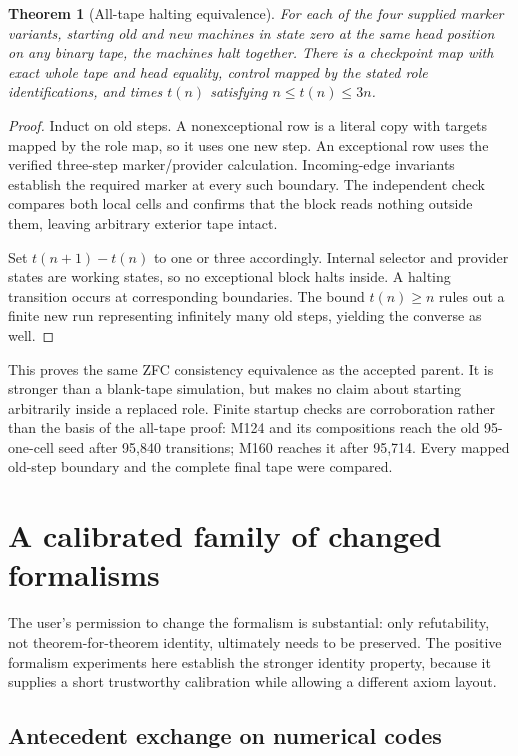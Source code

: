 \documentclass[11pt,a4paper]{article}
\newtheorem{theorem}{Theorem}[section]
\theoremstyle{definition}
\numberwithin{equation}{section}
\begin{document}
\begin{theorem}[All-tape halting equivalence]
For each of the four supplied marker variants, starting old and new
machines in state zero at the same head position on any binary tape,
the machines halt together. There is a checkpoint map with exact whole
tape and head equality, control mapped by the stated role identifications,
and times $t(n)$ satisfying $n\le t(n)\le3n$.
\end{theorem}
\begin{proof}
Induct on old steps. A nonexceptional row is a literal copy with targets
mapped by the role map, so it uses one new step. An exceptional row uses
the verified three-step marker/provider calculation. Incoming-edge
invariants establish the required marker at every such boundary.
The independent check compares both local cells and confirms that the
block reads nothing outside them, leaving arbitrary exterior tape intact.

Set $t(n+1)-t(n)$ to one or three accordingly. Internal selector and
provider states are working states, so no exceptional block halts inside.
A halting transition occurs at corresponding boundaries. The bound
$t(n)\ge n$ rules out a finite new run representing infinitely many old
steps, yielding the converse as well.
\end{proof}

This proves the same ZFC consistency equivalence as the accepted parent.
It is stronger than a blank-tape simulation, but makes no claim about
starting arbitrarily inside a replaced role. Finite startup checks are
corroboration rather than the basis of the all-tape proof: M124 and its
compositions reach the old 95-one-cell seed after 95,840 transitions;
M160 reaches it after 95,714. Every mapped old-step boundary and the
complete final tape were compared.

\section{A calibrated family of changed formalisms}
\label{sec:formalism}

The user's permission to change the formalism is substantial: only
refutability, not theorem-for-theorem identity, ultimately needs to be
preserved. The positive formalism experiments here establish the stronger
identity property, because it supplies a short trustworthy calibration
while allowing a different axiom layout.

\subsection{Antecedent exchange on numerical codes}
\end{document}

